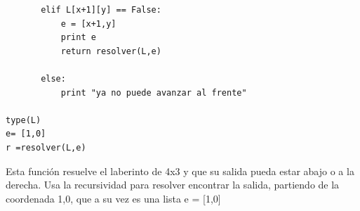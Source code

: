 \label{key}\documentclass[letterpaper, 12pt,oneside]{article}
\begin{document}
\begin{enumerate}
\begin{itemize}
\begin{lstlisting}
       elif L[x+1][y] == False:
           e = [x+1,y]
           print e
           return resolver(L,e)
           
       else:
           print "ya no puede avanzar al frente"

type(L)                      
e= [1,0]        
r =resolver(L,e)
				\end{lstlisting} Esta función resuelve el laberinto de 4x3 y que su salida pueda estar abajo o a la derecha. Usa la recursividad para resolver encontrar la salida, partiendo de la coordenada 1,0, que a su vez es una lista e = [1,0]
			
				
				
			\end{itemize}
		
		
		
			
			
		
		
	\end{enumerate}
	
	
	
	
	
	
	
	
	
	
	
\end{document}
